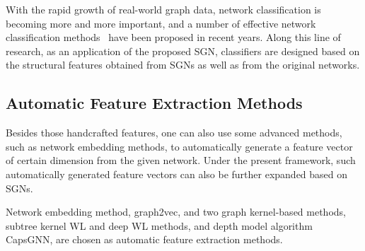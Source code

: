 \documentclass[10pt,journal,compsoc]{IEEEtran}
\begin{document}
With the rapid growth of real-world graph data, network classification is becoming more and more important, and a number of effective network classification methods~\cite{joachims2009predicting,kudo2005application,zhao2018substructure} have been proposed in recent years. Along this line of research, as an application of the proposed SGN, classifiers are designed based on the structural features obtained from SGNs as well as from the original networks.

\subsection{Automatic Feature Extraction Methods}

Besides those handcrafted features, one can also use some advanced methods, such as network embedding methods, to automatically generate a feature vector of certain dimension from the given network. Under the present framework, such automatically generated feature vectors can also be further expanded based on SGNs.

Network embedding method, graph2vec, and two graph kernel-based methods, subtree kernel WL and deep WL methods, and depth model algorithm CapsGNN, are chosen as automatic feature extraction methods.
\end{document}
